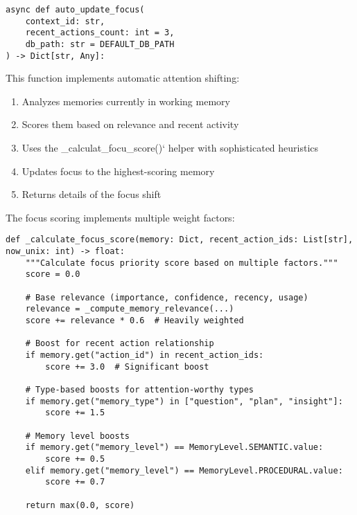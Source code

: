 \documentclass[12pt,a4paper]{article}
\begin{document}
\begin{pageablecode}
\begin{verbatim}
async def auto_update_focus(
    context_id: str,
    recent_actions_count: int = 3,
    db_path: str = DEFAULT_DB_PATH
) -> Dict[str, Any]:
\end{verbatim}
\end{pageablecode}
This function implements automatic attention shifting:
\begin{enumerate}[label=\arabic*.]
    \item Analyzes memories currently in working memory
    \item Scores them based on relevance and recent activity
    \item Uses the \1\_calculat\1\_focu\1\_score()` helper with sophisticated heuristics
    \item Updates focus to the highest-scoring memory
    \item Returns details of the focus shift
\end{enumerate}

The focus scoring implements multiple weight factors:
\begin{pageablecode}
\begin{verbatim}
def _calculate_focus_score(memory: Dict, recent_action_ids: List[str], now_unix: int) -> float:
    """Calculate focus priority score based on multiple factors."""
    score = 0.0

    # Base relevance (importance, confidence, recency, usage)
    relevance = _compute_memory_relevance(...)
    score += relevance * 0.6  # Heavily weighted

    # Boost for recent action relationship
    if memory.get("action_id") in recent_action_ids:
        score += 3.0  # Significant boost

    # Type-based boosts for attention-worthy types
    if memory.get("memory_type") in ["question", "plan", "insight"]:
        score += 1.5

    # Memory level boosts
    if memory.get("memory_level") == MemoryLevel.SEMANTIC.value:
        score += 0.5
    elif memory.get("memory_level") == MemoryLevel.PROCEDURAL.value:
        score += 0.7

    return max(0.0, score)
\end{verbatim}
\end{pageablecode}
\end{document}
